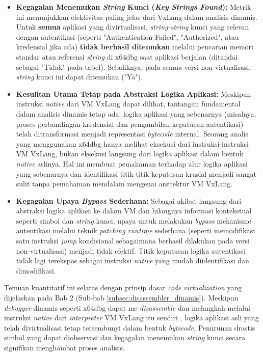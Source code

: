 \begin{itemize}
    \item \textbf{Kegagalan Menemukan \textit{String} Kunci (\textit{Key Strings Found}):}
      Metrik ini menunjukkan efektivitas paling jelas dari VxLang dalam analisis dinamis. Untuk \textbf{semua} aplikasi yang divirtualisasi, \textit{string-string} kunci yang relevan dengan autentikasi (seperti "Authentication Failed", "Authorized", atau kredensial jika ada) \textbf{tidak berhasil ditemukan} melalui pencarian memori standar atau referensi \textit{string} di x64dbg saat aplikasi berjalan (ditandai sebagai "Tidak" pada tabel). Sebaliknya, pada semua versi non-virtualisasi, \textit{string} kunci ini dapat ditemukan ("Ya"). 

    \item \textbf{Kesulitan Utama Tetap pada Abstraksi Logika Aplikasi:}
    Meskipun instruksi \textit{native} dari VM VxLang dapat dilihat, tantangan fundamental dalam analisis dinamis tetap ada: logika aplikasi yang sebenarnya (misalnya, proses perbandingan kredensial dan pengambilan keputusan autentikasi) telah ditransformasi menjadi representasi \textit{bytecode} internal. Seorang analis yang menggunakan x64dbg hanya melihat eksekusi dari instruksi-instruksi VM VxLang, bukan eksekusi langsung dari logika aplikasi dalam bentuk \textit{native} aslinya. Hal ini membuat pemahaman terhadap alur logika aplikasi yang sebenarnya dan identifikasi titik-titik keputusan krusial menjadi sangat sulit tanpa pemahaman mendalam mengenai arsitektur VM VxLang.

    \item \textbf{Kegagalan Upaya \textit{Bypass} Sederhana:}
    Sebagai akibat langsung dari abstraksi logika aplikasi ke dalam VM dan hilangnya informasi kontekstual seperti simbol dan \textit{string} kunci, upaya untuk melakukan \textit{bypass} mekanisme autentikasi melalui teknik \textit{patching runtime} sederhana (seperti memodifikasi satu instruksi \textit{jump} kondisional sebagaimana berhasil dilakukan pada versi non-virtualisasi) menjadi tidak efektif. Titik keputusan logika autentikasi tidak lagi terekspos sebagai instruksi \textit{native} yang mudah diidentifikasi dan dimodifikasi.
\end{itemize}

Temuan kuantitatif ini selaras dengan prinsip dasar \textit{code virtualization} yang dijelaskan pada Bab 2 (Sub-bab \ref{subsec:disassembler_dinamis}). Meskipun \textit{debugger} dinamis seperti x64dbg dapat me-\textit{disassemble} dan melangkah melalui instruksi \textit{native} dari \textit{interpreter} VM VxLang itu sendiri \cite{Sikorski2012}, logika aplikasi asli yang telah divirtualisasi tetap tersembunyi dalam bentuk \textit{bytecode}. Penurunan drastis simbol yang dapat diobservasi dan kegagalan menemukan \textit{string} kunci secara signifikan menghambat proses analisis.

